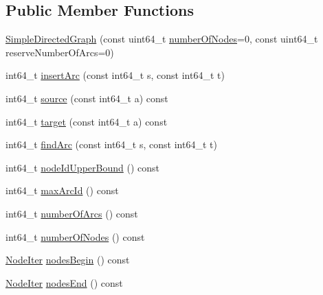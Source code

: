 \subsection*{Public Member Functions}
\begin{DoxyCompactItemize}
\item 
\hyperlink{classnifty_1_1graph_1_1SimpleDirectedGraph_a81190fff5233f90e9fb5cbb29fc46bda}{Simple\+Directed\+Graph} (const uint64\+\_\+t \hyperlink{classnifty_1_1graph_1_1SimpleDirectedGraph_a757bddbe78af1c5587a8aa213a924e3f}{number\+Of\+Nodes}=0, const uint64\+\_\+t reserve\+Number\+Of\+Arcs=0)
\item 
int64\+\_\+t \hyperlink{classnifty_1_1graph_1_1SimpleDirectedGraph_aec4eeda3468d8678b1ccab285b9cb9e5}{insert\+Arc} (const int64\+\_\+t s, const int64\+\_\+t t)
\item 
int64\+\_\+t \hyperlink{classnifty_1_1graph_1_1SimpleDirectedGraph_a7f485c4f446b1b95c4211c8fa4c87784}{source} (const int64\+\_\+t a) const 
\item 
int64\+\_\+t \hyperlink{classnifty_1_1graph_1_1SimpleDirectedGraph_ad38492560a573e2f1f4de14a1d315271}{target} (const int64\+\_\+t a) const 
\item 
int64\+\_\+t \hyperlink{classnifty_1_1graph_1_1SimpleDirectedGraph_aad6e2efc56adee1f93dcb7a7c1528851}{find\+Arc} (const int64\+\_\+t s, const int64\+\_\+t t)
\item 
int64\+\_\+t \hyperlink{classnifty_1_1graph_1_1SimpleDirectedGraph_a49962369af71f9768ab556c65ae84460}{node\+Id\+Upper\+Bound} () const 
\item 
int64\+\_\+t \hyperlink{classnifty_1_1graph_1_1SimpleDirectedGraph_a959805e538eafd5158bab87eeefd3ea5}{max\+Arc\+Id} () const 
\item 
int64\+\_\+t \hyperlink{classnifty_1_1graph_1_1SimpleDirectedGraph_a949760c5493c469e1280e4334a9f434e}{number\+Of\+Arcs} () const 
\item 
int64\+\_\+t \hyperlink{classnifty_1_1graph_1_1SimpleDirectedGraph_a757bddbe78af1c5587a8aa213a924e3f}{number\+Of\+Nodes} () const 
\item 
\hyperlink{classnifty_1_1graph_1_1SimpleDirectedGraph_a50b05474da6846da32398e01be9e3d30}{Node\+Iter} \hyperlink{classnifty_1_1graph_1_1SimpleDirectedGraph_a63f52c25a7cd332b1144077e8317e0fc}{nodes\+Begin} () const 
\item 
\hyperlink{classnifty_1_1graph_1_1SimpleDirectedGraph_a50b05474da6846da32398e01be9e3d30}{Node\+Iter} \hyperlink{classnifty_1_1graph_1_1SimpleDirectedGraph_a4b78d46edd4a3144405ac07b46c4353f}{nodes\+End} () const 

\end{DoxyCompactItemize}
